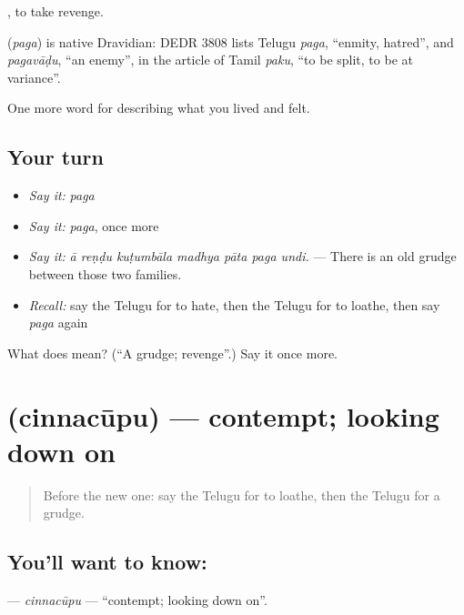 , to take revenge.

\begin{cousinweb}
\textbf{} (\emph{paga}) is native Dravidian: DEDR 3808 lists Telugu \emph{paga}, \textquotedblleft{}enmity, hatred\textquotedblright{}, and \emph{pagavāḍu}, \textquotedblleft{}an enemy\textquotedblright{}, in the article of Tamil \emph{paku}, \textquotedblleft{}to be split, to be at variance\textquotedblright{}.
\end{cousinweb}

\begin{grammarlens}[title={What you've built}]
One more word for describing what you lived and felt.
\end{grammarlens}

\subsection*{Your turn}
\begin{itemize}
\raggedright
  \item \emph{Say it:} \emph{paga}
  \item \emph{Say it:} \emph{paga}, once more
  \item \emph{Say it:} \emph{ā reṇḍu kuṭumbāla madhya pāta paga undi.} — There is an old grudge between those two families.
  \item \emph{Recall:} say the Telugu for to hate, then the Telugu for to loathe, then say \emph{paga} again
\end{itemize}

\begin{tcolorbox}[breakable,colback=teal!4,colframe=teal!35!black,title={Before you move on}]
What does  mean? (\textquotedblleft{}A grudge; revenge\textquotedblright{}.) Say it once more.
\end{tcolorbox}
\section[\texorpdfstring{\te{చిన్నచూపు} (cinnacūpu)}{చిన్నచూపు (cinnacūpu)}]{ (cinnacūpu) — contempt; looking down on}

\label{lesson:TE-C499-cinnacupu}



\begin{quote}
Before the new one: say the Telugu for to loathe, then the Telugu for a grudge.
\end{quote}

\subsection*{You'll want to know: }
\textbf{} — \emph{cinnacūpu} — \textquotedblleft{}contempt; looking down on\textquotedblright{}.

